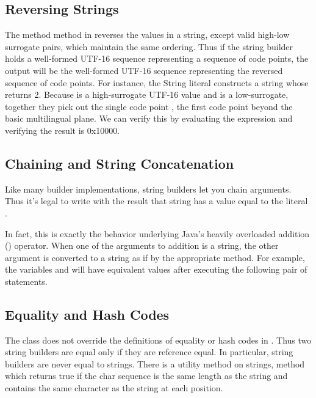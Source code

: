 \subsection{Reversing Strings}

The method  method in  reverses
the  values in a string, except valid high-low surrogate
pairs, which maintain the same ordering.  Thus if the string builder
holds a well-formed UTF-16 sequence representing a sequence of code
points, the output will be the well-formed UTF-16 sequence
representing the reversed sequence of code points.  For instance, the
String literal  constructs a string whose
 returns 2.  Because  is a
high-surrogate UTF-16  value and  is a
low-surrogate, together they pick out the single code point
, the first code point beyond the basic multilingual
plane.  We can verify this by evaluating the expression
 and verifying the result 
is 0x10000.


\subsection{Chaining and String Concatenation}

Like many builder implementations, string builders let you chain
arguments.  Thus it's legal to write
%
%
with the result that string  has a value equal to the
literal .

In fact, this is exactly the behavior underlying Java's heavily
overloaded addition (\code{+}) operator.  When one of the arguments to
addition is a string, the other argument is converted to a string as
if by the appropriate  method.  For example,
the variables  and  will have equivalent values after
executing the following pair of statements.
%



\subsection{Equality and Hash Codes}

The  class does not override the definitions of
equality or hash codes in .  Thus two string builders are
equal only if they are reference equal.  In particular, string
builders are never equal to strings.  There is a utility method on
strings,  method which
returns true if the char sequence is the same length as the string and
contains the same character as the string at each position.

